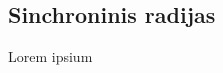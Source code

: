 \documentclass[main.tex]{subfiles}
\begin{document}
\subsection{Sinchroninis radijas}

Lorem ipsium
\end{document}
